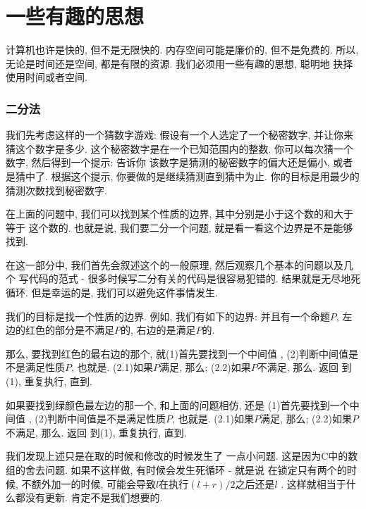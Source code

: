 \part{一些有趣的思想}

计算机也许是快的, 但不是无限快的. 内存空间可能是廉价的, 但不是免费的. 
所以, 无论是时间还是空间, 都是有限的资源. 我们必须用一些有趣的思想, 聪明地
抉择使用时间或者空间. 

\section{二分法}

我们先考虑这样的一个猜数字游戏: 假设有一个人选定了一个秘密数字, 并让你来猜这个数字是多少.
这个秘密数字是在一个已知范围内的整数. 你可以每次猜一个数字, 然后得到一个提示: 告诉你
该数字是猜测的秘密数字的偏大还是偏小, 或者是猜中了. 
根据这个提示, 你要做的是继续猜测直到猜中为止. 你的目标是用最少的猜测次数找到秘密数字. 

在上面的问题中, 我们可以找到某个性质的边界, 其中分别是小于这个数的和大于等于
这个数的. 也就是说, 我们要二分一个问题, 就是看一看这个边界是不是能够找到. 

在这一部分中, 我们首先会叙述这个的一般原理, 然后观察几个基本的问题以及几个
写代码的范式 - 很多时候写二分有关的代码是很容易犯错的. 结果就是无尽地死循环.
但是幸运的是, 我们可以避免这件事情发生. 


 我们的目标是找一个性质的边界. 例如, 我们有如下的边界: 
并且有一个命题$P$, 左边的红色的部分是不满足$P$的, 右边的是满足$P$的. 


那么, 要找到红色的最右边的那个, 就(1)首先要找到一个中间值
, (2)判断中间值是不是满足性质$P$, 也就是. (2.1)如果$P$满足, 
那么; (2.2)如果$P$不满足, 那么. 返回
到(1), 重复执行, 直到. 

如果要找到绿颜色最左边的那一个, 和上面的问题相仿, 还是
(1)首先要找到一个中间值
, (2)判断中间值是不是满足性质$P$, 也就是. (2.1)如果$P$满足, 
那么; (2.2)如果$P$不满足, 那么. 返回
到(1), 重复执行, 直到. 

我们发现上述只是在取的时候和修改的时候发生了
一点小问题. 这是因为C中的数组的舍去问题. 如果不这样做, 有时候会发生死循环 - 就是说
在锁定只有两个的时候, 不额外加一的时候, 可能会导致$l$在执行$(l+r)/2$之后还是$l$
. 这样就相当于什么都没有更新. 肯定不是我们想要的. 

